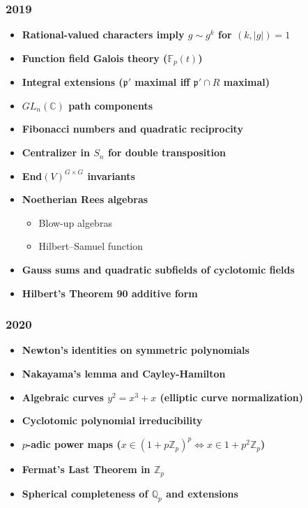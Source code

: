 \subsubsection*{2019}
\begin{itemize}
    \item \textbf{Rational-valued characters imply $g \sim g^k$ for $(k,|g|)=1$}
    \item \textbf{Function field Galois theory ($\mathbb{F}_p(t)$)}
    \item \textbf{Integral extensions ($\mathfrak{p}'$ maximal iff $\mathfrak{p}' \cap R$ maximal)}
    \item \textbf{$GL_n(\mathbb{C})$ path components}
    \item \textbf{Fibonacci numbers and quadratic reciprocity}
    \item \textbf{Centralizer in $S_n$ for double transposition}
    \item \textbf{End$(V)^{G \times G}$ invariants}
    \item \textbf{Noetherian Rees algebras}
        \begin{itemize}
            \item Blow-up algebras
            \item Hilbert--Samuel function
        \end{itemize}
    \item \textbf{Gauss sums and quadratic subfields of cyclotomic fields}
    \item \textbf{Hilbert's Theorem 90 additive form}
\end{itemize}

\subsubsection*{2020}
\begin{itemize}
    \item \textbf{Newton's identities on symmetric polynomials}
    \item \textbf{Nakayama's lemma and Cayley-Hamilton}
    \item \textbf{Algebraic curves $y^2 = x^3+x$ (elliptic curve normalization)}
    \item \textbf{Cyclotomic polynomial irreducibility}
    \item \textbf{$p$-adic power maps ($x \in (1+p\mathbb{Z}_p)^p \iff x \in 1+p^2\mathbb{Z}_p$)}
    \item \textbf{Fermat's Last Theorem in $\mathbb{Z}_p$}
    \item \textbf{Spherical completeness of $\mathbb{Q}_p$ and extensions}
\end{itemize}

